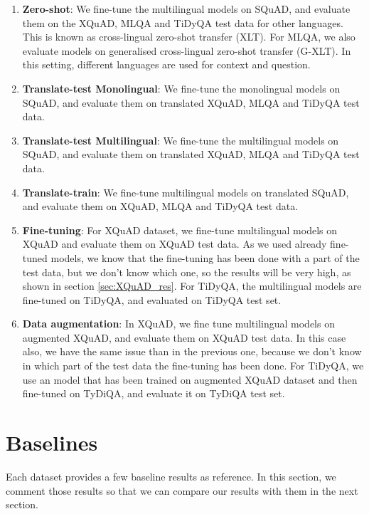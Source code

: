 \documentclass[11pt]{article}
\begin{document}
\begin{enumerate}
    \item \textbf{Zero-shot}: We fine-tune the multilingual models on SQuAD, and evaluate them on the XQuAD, MLQA and TiDyQA test data for other languages. This is known as cross-lingual zero-shot transfer (XLT). For MLQA, we also evaluate models on generalised cross-lingual zero-shot transfer (G-XLT). In this setting, different languages are used for context and question.
    
    \item \textbf{Translate-test Monolingual}: We fine-tune the monolingual models on SQuAD, and evaluate them on translated XQuAD, MLQA and TiDyQA test data.
    
    \item \textbf{Translate-test Multilingual}: We fine-tune the multilingual models on SQuAD, and evaluate them on translated XQuAD, MLQA and TiDyQA test data.
    
    \item \textbf{Translate-train}: We fine-tune multilingual models on translated SQuAD, and evaluate them on XQuAD, MLQA and TiDyQA test data.
    
    \item \textbf{Fine-tuning}: For XQuAD dataset, we fine-tune multilingual models on XQuAD and evaluate them on XQuAD test data. As we used already fine-tuned models, we know that the fine-tuning has been done with a part of the test data, but we don't know which one, so the results will be very high, as shown in section \ref{sec:XQuAD_res}. For TiDyQA, the multilingual models are fine-tuned on TiDyQA, and evaluated on TiDyQA test set.
    
    \item \textbf{Data augmentation}: In XQuAD, we fine tune multilingual models on augmented XQuAD, and evaluate them on XQuAD test data. In this case also, we have the same issue than in the previous one, because we don't know in which part of the test data the fine-tuning has been done. For TiDyQA, we use an model that has been trained on augmented XQuAD dataset and then fine-tuned on TyDiQA, and evaluate it on TyDiQA test set.
\end{enumerate}

\section{Baselines}

Each dataset provides a few baseline results as reference. In this section, we comment those results so that we can compare our results with them in the next section.
\end{document}

